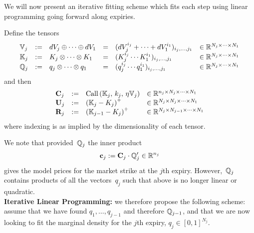 \documentclass[twoside]{article}
\DeclareRobustCommand{\R}{\mathbb{R}}
\theoremstyle{plain}
\theoremstyle{definition}
\theoremstyle{remark}
\begin{document}
We will now present an iterative fitting scheme which fits each step using linear programming
going forward along expiries.

Define the tensors
$$
\begin{array}{llllll}
    {\mathbb V}_j & := & dV_j \oplus \cdots \oplus dV_1 & = & ( dV^{i_j}_j+\cdots+dV^{i_1}_1 )_{i_j,\ldots,j_1} & \in \R^{N_j\times \cdots \times N_1}\\
    \K_j & := & K_j \otimes \cdots \otimes K_1 & = &  ( K^{i_j}_j \cdots K^{i_1}_1 )_{i_j,\ldots,j_1} & \in \R^{N_j\times \cdots \times N_1}\\
    \Q_j & := & q_j \otimes \cdots \otimes q_1 & = & ( q^{i_j}_j \cdots q^{i_1}_1 )_{i_j,\ldots,j_1} & \in \R^{N_j\times \cdots \times N_1}
\end{array}
$$
and then
$$
\begin{array}{llll}
    \mathbf{C}_j 
    & := & \mathrm{Call}\left( \K_j,\, k_j,\,\eta {\mathbb V}_j \right) & \in \R^{n_j \times N_j \times \cdots \times N_1}\\
    \mathbf{U}_j 
    & := & \left( \K_j - K_j \right)^+ & \in \R^{N_j \times N_j \times \cdots \times N_1}\\
    \mathbf{R}_j 
    & := & \left( \K_{j-1} - K_j \right)^+ & \in \R^{N_j \times N_{j-1} \times \cdots \times N_1}
\end{array}
$$
where indexing is as implied by the dimensionality of each tensor.

We note that provided~$\mathbb{Q}_j$ the inner product
$$
    \mathbf{c}_j := \mathbf{C}_j \cdot \Q_j' \in \R^{n_j}
$$
gives the model prices for the market strike at the $j$th expiry.
However,~$\mathbb{Q}_j$ contains products of all the vectors~$q_j$ such that above is no longer
linear or quadratic.\\

\noindent
\textbf{Iterative Linear Programming:} we therefore propose the following scheme: assume that 
we have found $q_1,\ldots,q_{j-1}$ and therefore $\mathbb{Q}_{j-1}$, and that we are now 
looking to fit the marginal density for
the $j$th expiry, $q_j\in [0,1]^{N_j}$.
\end{document}
